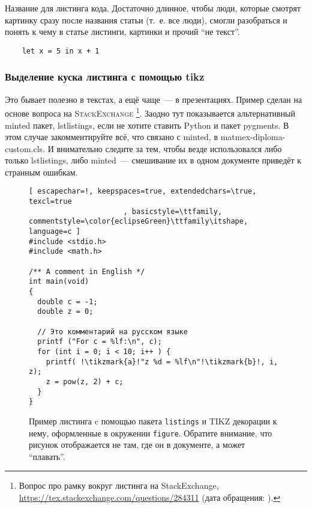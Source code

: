 \begin{listing}
    \caption{Название для листинга кода. Достаточно длинное, чтобы люди, которые смотрят картинку сразу после названия статьи (т.~е. все люди), смогли разобраться и понять к чему в статье листинги, картинки и прочий \enquote{не текст}.}
    \begin{verbatim}
    let x = 5 in x + 1
  \end{verbatim}
\end{listing}

\subsubsection{Выделение куска листинга с помощью tikz}
Это бывает полезно в текстах, а ещё чаще~--- в презентациях.
Пример сделан на основе вопроса на \textsc{StackExchange}%
\footnote{Вопрос про рамку вокруг листинга на StackExchange, \url{https://tex.stackexchange.com/questions/284311} (дата обращения: ).}.
Заодно тут показывается альтернативный minted пакет, lstlistings, если не хотите ставить Python и пакет pygments.
В этом случае закомментируйте всё, что связано с minted, в matmex-diploma-custom.cls.
И внимательно следите за тем, чтобы везде использовался либо только lstlistings, либо minted~--- смешивание их в одном документе приведёт к странным ошибкам.

\begin{figure}
    \begin{lstlisting}[ escapechar=!, keepspaces=true, extendedchars=\true, texcl=true
                      , basicstyle=\ttfamily, commentstyle=\color{eclipseGreen}\ttfamily\itshape, language=c ]
#include <stdio.h>
#include <math.h>

/** A comment in English */
int main(void)
{
  double c = -1;
  double z = 0;

  // Это комментарий на русском языке
  printf ("For c = %lf:\n", c);
  for (int i = 0; i < 10; i++ ) {
    printf( !\tikzmark{a}!"z %d = %lf\n"!\tikzmark{b}!, i, z);
    z = pow(z, 2) + c;
  }
}
\end{lstlisting}

    \caption{Пример листинга c помощью пакета \texttt{listings} и \textsc{TIKZ} декорации к нему, оформленные в окружении \texttt{figure}.
        Обратите внимание, что рисунок отображается не там, где он в документе, а может \enquote{плавать}.}
\end{figure}

